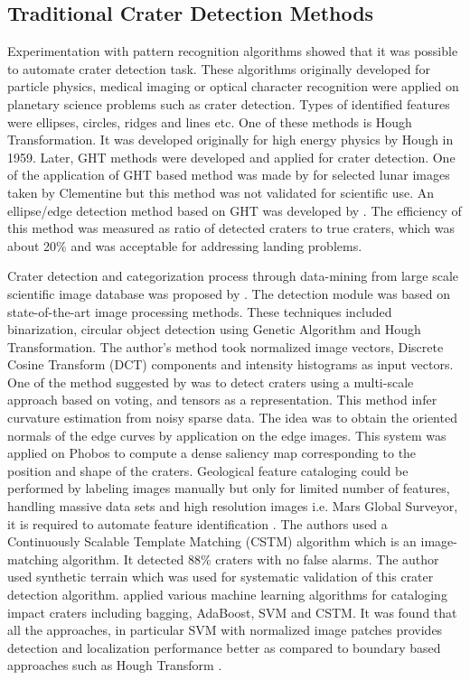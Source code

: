 \documentclass[11pt]{article}
\begin{document}
\subsection{Traditional Crater Detection Methods}
Experimentation with pattern recognition algorithms showed that it was possible to automate crater detection task. These algorithms originally developed for particle physics, medical imaging or optical character recognition were applied on planetary science problems such as crater detection. Types of identified features were ellipses, circles, ridges and lines etc. One of these methods is Hough Transformation. It was developed originally for high energy physics by Hough in 1959. Later, GHT methods were developed and applied for crater detection. One of the application of GHT based method was made by \cite{honda2000crater} for selected lunar images taken by Clementine but this method was not validated for scientific use. An ellipse/edge detection method based on GHT was developed by \cite{leroy2001crater}. The efficiency of this method was measured as ratio of detected craters to true craters, which was about 20\% and was acceptable for addressing landing problems.

Crater detection and categorization process through data-mining from large scale scientific image database was proposed by \cite{honda2000crater}. The detection module was based on state-of-the-art image processing methods. These techniques included binarization, circular object detection using Genetic Algorithm and Hough Transformation. The author's method took normalized image vectors, Discrete Cosine Transform (DCT) components and intensity histograms as input vectors. One of the method suggested by \cite{leroy2001crater} was to detect craters using a multi-scale approach based on voting, and tensors as a representation. This method infer curvature estimation from noisy sparse data. The idea was to obtain the oriented normals of the edge curves by application on the edge images. This system was applied on Phobos to compute a dense saliency map corresponding to the position and shape of the craters. Geological feature cataloging could be performed by labeling images manually but only for limited number of features, handling massive data sets and high resolution images i.e. Mars Global Surveyor, it is required to automate feature identification \cite{vinogradova2002training}. The authors used a Continuously Scalable Template Matching (CSTM) algorithm which is an image-matching algorithm. It detected 88\% craters with no false alarms. The author used synthetic terrain which was used for systematic validation of this crater detection algorithm. \cite{wetzler2005learning} applied various machine learning algorithms for cataloging impact craters including bagging, AdaBoost, SVM and CSTM. It was found that all the approaches, in particular SVM with normalized image patches provides detection and localization performance better as compared to boundary based approaches such as Hough Transform  \cite{wetzler2005learning}.
\end{document}
